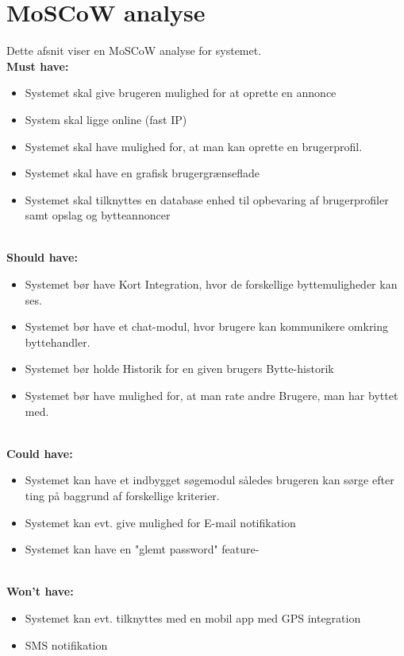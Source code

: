 \chapter{MoSCoW analyse}
Dette afsnit viser en MoSCoW analyse for systemet. \\
\textbf{Must have:}
\begin{itemize}[noitemsep]
	\item Systemet skal give brugeren mulighed for at oprette en annonce
	\item System skal ligge online (fast IP)
	\item Systemet skal have mulighed for, at man kan oprette en brugerprofil.
	\item Systemet skal have en grafisk brugergrænseflade
	\item Systemet skal tilknyttes en database enhed til opbevaring af brugerprofiler samt opslag og bytteannoncer 
	
\end{itemize}

\textbf{\\Should have:}
\begin{itemize}[noitemsep]
	\item Systemet bør have Kort Integration, hvor de forskellige byttemuligheder kan ses.
	\item Systemet bør have et chat-modul, hvor brugere kan kommunikere omkring byttehandler.
	\item Systemet bør holde Historik for en given brugers Bytte-historik
	\item Systemet bør have mulighed for, at man rate andre Brugere, man har byttet med.
	
\end{itemize}

\textbf{\\Could have:}
\begin{itemize}[noitemsep]
	\item Systemet kan have et indbygget søgemodul således brugeren kan sørge efter ting på baggrund af forskellige kriterier.
	\item Systemet kan evt. give mulighed for E-mail notifikation
	\item Systemet kan have en "glemt password" feature-
\end{itemize}

\textbf{\\Won't have:}
\begin{itemize}[noitemsep]
	\item Systemet kan evt. tilknyttes med en mobil app med GPS integration
	\item SMS notifikation 


\end{itemize}